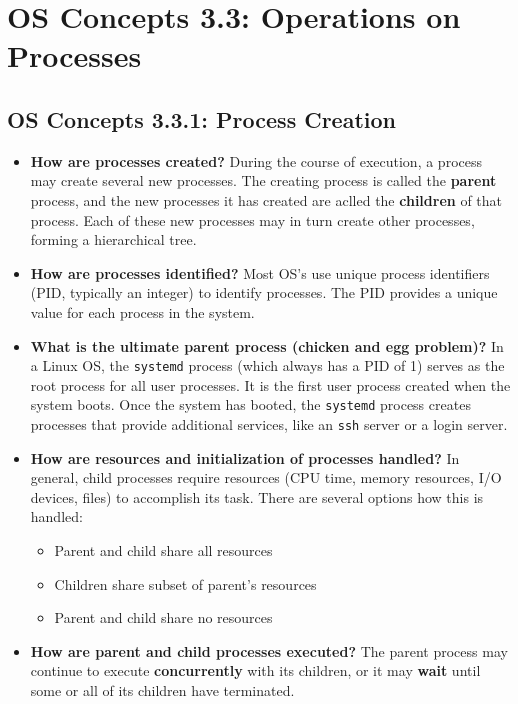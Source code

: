 \documentclass[12pt]{article}
\begin{document}
\section*{OS Concepts 3.3: Operations on Processes}

\subsection*{OS Concepts 3.3.1: Process Creation}

\begin{itemize}
    \item \textbf{How are processes created?} During the course of execution, a process may create several new processes. The creating process is called the \textbf{parent} process, and the new processes it has created are aclled the \textbf{children} of that process. Each of these new processes may in turn create other processes, forming a hierarchical tree.
    \item \textbf{How are processes identified?} Most OS's use unique process identifiers (PID, typically an integer) to identify processes. The PID provides a unique value for each process in the system.
    \item \textbf{What is the ultimate parent process (chicken and egg problem)?} In a Linux OS, the \texttt{systemd} process (which always has a PID of 1) serves as the root process for all user processes. It is the first user process created when the system boots. Once the system has booted, the \texttt{systemd} process creates processes that provide additional services, like an \texttt{ssh} server or a login server.
    \item \textbf{How are resources and initialization of processes handled?} In general, child processes require resources (CPU time, memory resources, I/O devices, files) to accomplish its task. There are several options how this is handled:
        \begin{itemize}
            \item Parent and child share all resources
            \item Children share subset of parent's resources
            \item Parent and child share no resources
        \end{itemize}
    \item \textbf{How are parent and child processes executed?} The parent process may continue to execute \textbf{concurrently} with its children, or it may \textbf{wait} until some or all of its children have terminated.

\end{itemize}
\end{document}
